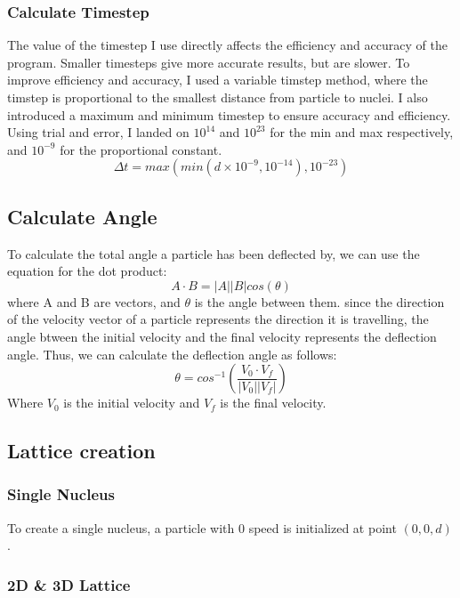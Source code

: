 \documentclass[11pt]{article}
\begin{document}
    \hypertarget{calculate-timestep}{%
\subsubsection{Calculate Timestep}\label{calculate-timestep}}

The value of the timestep I use directly affects the efficiency and
accuracy of the program. Smaller timesteps give more accurate results,
but are slower. To improve efficiency and accuracy, I used a variable
timstep method, where the timstep is proportional to the smallest
distance from particle to nuclei. I also introduced a maximum and
minimum timestep to ensure accuracy and efficiency. Using trial and
error, I landed on \(10^{14}\) and \(10^{23}\) for the min and max
respectively, and \(10^{-9}\) for the proportional constant.
\[ \Delta t=max(min(d\times 10^{-9}, 10^{-14}), 10^{-23}) \]

    \hypertarget{calculate-angle}{%
\subsection{Calculate Angle}\label{calculate-angle}}

To calculate the total angle a particle has been deflected by, we can
use the equation for the dot product:
\[ A \cdot B = |A||B|cos(\theta) \] where A and B are vectors, and
\(\theta\) is the angle between them. since the direction of the
velocity vector of a particle represents the direction it is travelling,
the angle btween the initial velocity and the final velocity represents
the deflection angle. Thus, we can calculate the deflection angle as
follows:
\[ \theta = cos^{-1}(\frac{V_{0} \cdot V_{f}}{|V_{0}||V_{f}|}) \] Where
\(V_{0}\) is the initial velocity and \(V_{f}\) is the final velocity.

    \hypertarget{lattice-creation}{%
\subsection{Lattice creation}\label{lattice-creation}}

\hypertarget{single-nucleus}{%
\subsubsection{Single Nucleus}\label{single-nucleus}}

To create a single nucleus, a particle with 0 speed is initialized at
point \((0, 0, d)\).

\hypertarget{d-3d-lattice}{%
\subsubsection{2D \& 3D Lattice}\label{d-3d-lattice}}
\end{document}
